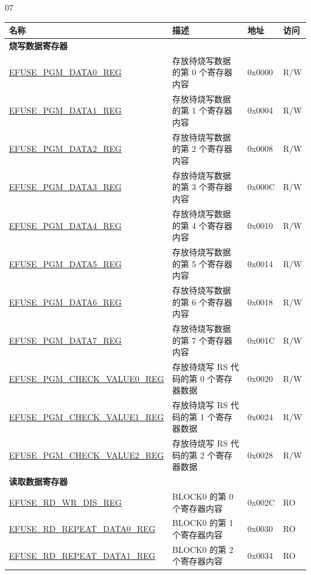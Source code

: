 07\begin{longtable}{ | p{6cm} | p{7.2cm} | p{1.3cm} | p{1cm} | }
\hline\rowcolor{lightgray}
名称 & 描述 &  地址 & 访问 \\ \hline
\endhead
\multicolumn{4}{|l|}{\textbf{烧写数据寄存器}} \\ \hline
\hyperref[regdesc:EFUSEPGMDATA0REG]{EFUSE\_PGM\_DATA0\_REG} & 存放待烧写数据的第 0 个寄存器内容 & 0x0000 & R/W \\ \hline
\hyperref[regdesc:EFUSEPGMDATA1REG]{EFUSE\_PGM\_DATA1\_REG} & 存放待烧写数据的第 1 个寄存器内容 & 0x0004 & R/W \\ \hline
\hyperref[regdesc:EFUSEPGMDATA2REG]{EFUSE\_PGM\_DATA2\_REG} & 存放待烧写数据的第 2 个寄存器内容 & 0x0008 & R/W \\ \hline
\hyperref[regdesc:EFUSEPGMDATA3REG]{EFUSE\_PGM\_DATA3\_REG} & 存放待烧写数据的第 3 个寄存器内容 & 0x000C & R/W \\ \hline
\hyperref[regdesc:EFUSEPGMDATA4REG]{EFUSE\_PGM\_DATA4\_REG} & 存放待烧写数据的第 4 个寄存器内容 & 0x0010 & R/W \\ \hline
\hyperref[regdesc:EFUSEPGMDATA5REG]{EFUSE\_PGM\_DATA5\_REG} & 存放待烧写数据的第 5 个寄存器内容 & 0x0014 & R/W \\ \hline
\hyperref[regdesc:EFUSEPGMDATA6REG]{EFUSE\_PGM\_DATA6\_REG} & 存放待烧写数据的第 6 个寄存器内容 & 0x0018 & R/W \\ \hline
\hyperref[regdesc:EFUSEPGMDATA7REG]{EFUSE\_PGM\_DATA7\_REG} & 存放待烧写数据的第 7 个寄存器内容 & 0x001C & R/W \\ \hline
\hyperref[regdesc:EFUSEPGMCHECKVALUE0REG]{EFUSE\_PGM\_CHECK\_VALUE0\_REG} & 存放待烧写 RS 代码的第 0 个寄存器数据  & 0x0020 & R/W \\ \hline
\hyperref[regdesc:EFUSEPGMCHECKVALUE1REG]{EFUSE\_PGM\_CHECK\_VALUE1\_REG} & 存放待烧写 RS 代码的第 1 个寄存器数据  & 0x0024 & R/W \\ \hline
\hyperref[regdesc:EFUSEPGMCHECKVALUE2REG]{EFUSE\_PGM\_CHECK\_VALUE2\_REG} & 存放待烧写 RS 代码的第 2 个寄存器数据  & 0x0028 & R/W \\ \hline
\multicolumn{4}{|l|}{\textbf{读取数据寄存器}} \\ \hline
\hyperref[regdesc:EFUSERDWRDISREG]{EFUSE\_RD\_WR\_DIS\_REG} & BLOCK0 的第 0 个寄存器内容  & 0x002C & RO \\ \hline
\hyperref[regdesc:EFUSERDREPEATDATA0REG]{EFUSE\_RD\_REPEAT\_DATA0\_REG} & BLOCK0 的第 1 个寄存器内容  & 0x0030 & RO \\ \hline
\hyperref[regdesc:EFUSERDREPEATDATA1REG]{EFUSE\_RD\_REPEAT\_DATA1\_REG} & BLOCK0 的第 2 个寄存器内容  & 0x0034 & RO \\ \hline

\end{longtable}
